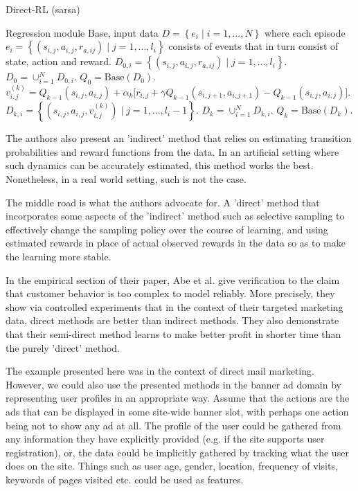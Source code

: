 \documentclass{article} %
\newcommand{\setof}[1]{\ensuremath{\left \{ #1 \right \}}}
\begin{document}
\begin{algorithm}
  \caption{Direct-RL (sarsa) \cite{abe2002empirical}}
  \label{alg:directrl}
  \begin{algorithmic}[1]
    \Require Regression module Base, input data $D = \setof{e_i \;|\;
    i=1,...,N}$ where each episode $e_i = \setof{(s_{i,j}, a_{i,j}, r_{a,ij})
    \;|\; j=1,...,l_i}$ consists of events that in turn consist of state,
    action and reward.
      \State $D_{0,i} = \setof{(s_{i,j}, a_{i,j}, r_{a,ij}) \;|\;
      j=1,...,l_i}$.
    \EndFor
    \State $D_0 = \cup_{i=1}^N D_{0,i}$.
    \State $Q_0 = \text{Base}(D_0)$.
        \State $v^{(k)}_{i,j} = Q_{k-1}(s_{i,j}, a_{i,j}) +
        \alpha_k \big[ r_{i,j} + \gamma Q_{k-1}(s_{i, j+1}, a_{i, j+1}) -
        Q_{k-1}(s_{i,j}, a_{i,j}) \big]$.
        \State $D_{k,i} = \setof{(s_{i,j}, a_{i,j}, v^{(k)}_{i,j}) \;|\;
      j=1,...,l_i-1}$.
        \EndFor
      \EndFor
      \State $D_k = \cup_{i=1}^N D_{k,i}$.
      \State $Q_k = \text{Base}(D_k)$.
    \EndFor
    \State{}
  \end{algorithmic}
\end{algorithm}

The authors also present an 'indirect' method that relies on estimating
transition probabilities and reward functions from the data. In an
artificial setting where such dynamics can be accurately estimated, this method
works the best. Nonetheless, in a real world setting, such is not the case.

The middle road is what the authors advocate for. A 'direct' method that
incorporates some aspects of the 'indirect' method such as selective sampling
to effectively change the sampling policy over the course of learning, and
using estimated rewards in place of actual observed rewards in the data so as
to make the learning more stable.


In the empirical section of their paper, Abe et al. \cite{abe2002empirical}
give verification to the claim that customer behavior is too complex to model
reliably. More precisely, they show via controlled experiments that in the
context of their targeted marketing data, direct methods are better than
indirect methods. They also demonstrate that their semi-direct method learns to
make better profit in shorter time than the purely 'direct' method.

The example presented here was in the context of direct mail marketing.
However, we could also use the presented methods in the banner ad domain by
representing user profiles in an appropriate way. Assume that the actions are
the ads that can be displayed in some site-wide banner slot, with perhaps one
action being not to show any ad at all. The profile of the user could be
gathered from any information they have explicitly provided (e.g. if the site
supports user registration), or, the data could be implicitly gathered by
tracking what the user does on the site. Things such as user age, gender,
location, frequency of visits, keywords of pages visited etc. could be used as
features.
\end{document}
